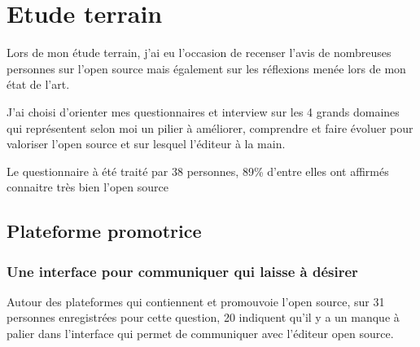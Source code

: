 \chapter{Etude terrain} %

Lors de mon étude terrain, j'ai eu l'occasion de recenser l'avis de nombreuses personnes sur l'open source mais également sur les réflexions menée lors de mon état de l'art.

J'ai choisi d'orienter mes questionnaires et interview sur les 4 grands domaines qui représentent selon moi un pilier à améliorer, comprendre et faire évoluer pour valoriser l'open source et sur lesquel l'éditeur à la main.

Le questionnaire à été traité par 38 personnes, 89\% d'entre elles ont affirmés connaitre très bien l'open source 

	\section{Plateforme promotrice}

		\subsection{Une interface pour communiquer qui laisse à désirer}

			Autour des plateformes qui contiennent et promouvoie l'open source, sur 31 personnes enregistrées pour cette question, 20 indiquent qu'il y a un manque à palier dans l'interface qui permet de communiquer avec l'éditeur open source. 

